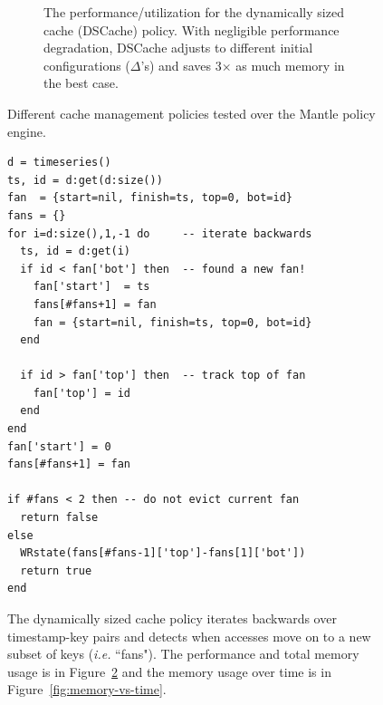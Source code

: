 \begin{figure}[t!]
\begin{subfigure}[t]{0.48\textwidth}
	\caption{The performance/utilization for the dynamically sized cache (DSCache)
policy. With negligible performance degradation, DSCache adjusts to different initial configurations
(\(\Delta\)'s) and saves 3\(\times\) as much memory in the best case.
\label{fig:dscache-vs-none}}

    \end{subfigure}%
    \caption{Different cache management policies tested over the Mantle policy engine.}
\end{figure}

\begin{figure}[tb]
\footnotesize
\begin{verbatim}
d = timeseries()
ts, id = d:get(d:size())
fan  = {start=nil, finish=ts, top=0, bot=id}
fans = {}
for i=d:size(),1,-1 do     -- iterate backwards
  ts, id = d:get(i)
  if id < fan['bot'] then  -- found a new fan!
    fan['start']  = ts
    fans[#fans+1] = fan 
    fan = {start=nil, finish=ts, top=0, bot=id}
  end 

  if id > fan['top'] then  -- track top of fan
    fan['top'] = id 
  end 
end
fan['start'] = 0 
fans[#fans+1] = fan 

if #fans < 2 then -- do not evict current fan
  return false
else
  WRstate(fans[#fans-1]['top']-fans[1]['bot']) 
  return true
end
\end{verbatim}
\caption{The dynamically sized cache policy iterates backwards over
timestamp-key pairs and detects when accesses move on to a new subset of keys
({\it i.e.} ``fans"). The performance and total memory usage is in
Figure~\ref{fig:dscache-vs-none} and the memory usage over time is in
Figure~\ref{fig:memory-vs-time}.
\label{src:dyn-cache}}
\end{figure}

